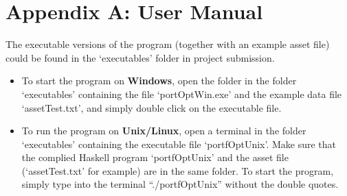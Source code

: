 \chapter*{Appendix A: User Manual}
The executable versions of the program (together with an example asset file) could be found in the `executables' folder in project submission.

\begin{itemize}
  \item To start the program on \textbf{Windows}, open the folder in the folder `executables' containing the file `portOptWin.exe' and the example data file `assetTest.txt', and simply double click on the executable file.
  \item To run the program on \textbf{Unix/Linux}, open a terminal in the folder `executables' containing the executable file `portfOptUnix'. Make sure that the complied Haskell program `portfOptUnix' and the asset file (`assetTest.txt' for example) are in the same folder. To start the program, simply type into the terminal ``./portfOptUnix'' without the double quotes.
\end{itemize}


